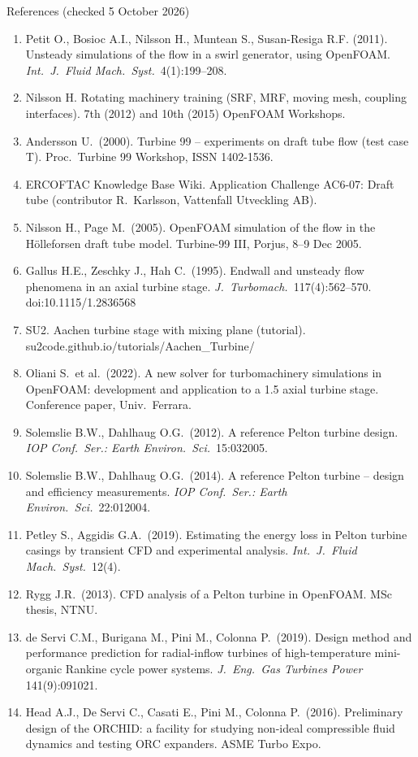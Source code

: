 \documentclass[aspectratio=169,10pt]{beamer}
\begin{document}
\begin{frame}[allowframebreaks]{References (checked 5 October 2026)}
\begin{enumerate}
\item Petit O., Bosioc A.I., Nilsson H., Muntean S., Susan-Resiga R.F. (2011). Unsteady simulations of the flow in a swirl generator, using OpenFOAM. \emph{Int.\ J.\ Fluid Mach.\ Syst.}\ 4(1):199--208.
\item Nilsson H. Rotating machinery training (SRF, MRF, moving mesh, coupling interfaces). 7th (2012) and 10th (2015) OpenFOAM Workshops.
\item Andersson U.\ (2000). Turbine 99 -- experiments on draft tube flow (test case T). Proc.\ Turbine 99 Workshop, ISSN 1402-1536.
\item ERCOFTAC Knowledge Base Wiki. Application Challenge AC6-07: Draft tube (contributor R.\ Karlsson, Vattenfall Utveckling AB).
\item Nilsson H., Page M.\ (2005). OpenFOAM simulation of the flow in the Hölleforsen draft tube model. Turbine-99 III, Porjus, 8--9 Dec 2005.
\item Gallus H.E., Zeschky J., Hah C.\ (1995). Endwall and unsteady flow phenomena in an axial turbine stage. \emph{J.\ Turbomach.}\ 117(4):562--570. doi:10.1115/1.2836568
\item SU2. Aachen turbine stage with mixing plane (tutorial). su2code.github.io/tutorials/Aachen\_Turbine/
\item Oliani S.\ et al.\ (2022). A new solver for turbomachinery simulations in OpenFOAM: development and application to a 1.5 axial turbine stage. Conference paper, Univ.\ Ferrara.
\item Solemslie B.W., Dahlhaug O.G.\ (2012). A reference Pelton turbine design. \emph{IOP Conf.\ Ser.: Earth Environ.\ Sci.}\ 15:032005.
\item Solemslie B.W., Dahlhaug O.G.\ (2014). A reference Pelton turbine -- design and efficiency measurements. \emph{IOP Conf.\ Ser.: Earth Environ.\ Sci.}\ 22:012004.
\item Petley S., Aggidis G.A.\ (2019). Estimating the energy loss in Pelton turbine casings by transient CFD and experimental analysis. \emph{Int.\ J.\ Fluid Mach.\ Syst.}\ 12(4).
\item Rygg J.R.\ (2013). CFD analysis of a Pelton turbine in OpenFOAM. MSc thesis, NTNU.
\item de Servi C.M., Burigana M., Pini M., Colonna P.\ (2019). Design method and performance prediction for radial-inflow turbines of high-temperature mini-organic Rankine cycle power systems. \emph{J.\ Eng.\ Gas Turbines Power} 141(9):091021.
\item Head A.J., De Servi C., Casati E., Pini M., Colonna P.\ (2016). Preliminary design of the ORCHID: a facility for studying non-ideal compressible fluid dynamics and testing ORC expanders. ASME Turbo Expo.

\end{enumerate}
\end{frame}
\end{document}
